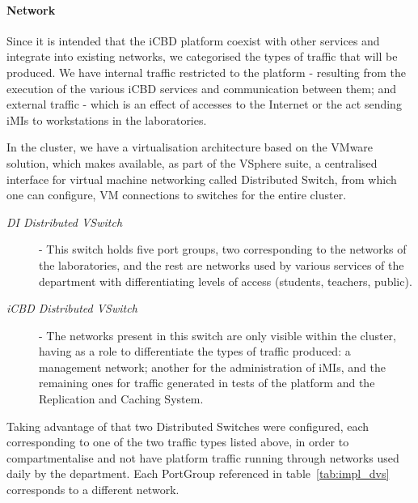 \paragraph{Network}
\label{par:impl_infra_network}

Since it is intended that the iCBD platform coexist with other services and integrate into existing networks, we categorised the types of traffic that will be produced. We have internal traffic restricted to the platform - resulting from the execution of the various iCBD services and communication between them; and external traffic - which is an effect of accesses to the Internet or the act sending iMIs to workstations in the laboratories.

In the cluster, we have a virtualisation architecture based on the VMware solution, which makes available, as part of the VSphere suite, a centralised interface for virtual machine networking called Distributed Switch, from which one can configure, VM connections to switches for the entire cluster. 

\begin{description}
	\item [\textit{DI Distributed VSwitch}] - This switch holds five port groups, two corresponding to the networks of the laboratories, and the rest are networks used by various services of the department with differentiating levels of access (students, teachers, public).
	\item [\textit{iCBD Distributed VSwitch}] - The networks present in this switch are only visible within the cluster, having as a role to differentiate the types of traffic produced: a management network; another for the administration of iMIs, and the remaining ones for traffic generated in tests of the platform and the Replication and Caching System.
\end{description}

Taking advantage of that two Distributed Switches were configured, each corresponding to one of the two traffic types listed above, in order to compartmentalise and not have platform traffic running through networks used daily by the department. Each PortGroup referenced in table~\ref{tab:impl_dvs} corresponds to a different network.

